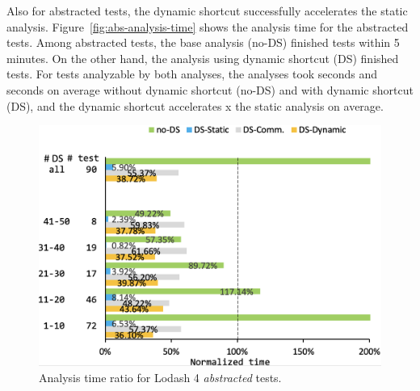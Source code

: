 Also for abstracted tests, the dynamic shortcut successfully accelerates the
static analysis.  Figure~\ref{fig:abs-analysis-time} shows the analysis time for
the abstracted tests.  Among  abstracted tests, the base analysis
(no-DS) finished  tests within 5 minutes.  On the other hand, the
analysis using dynamic shortcut (DS) finished  tests.  For 
tests analyzable by both analyses, the analyses took  seconds and
 seconds on average without dynamic shortcut (no-DS) and with
dynamic shortcut (DS), and the dynamic shortcut accelerates
\textsf{x} the static analysis on average.

\begin{figure}
  \centering
  \includegraphics[width=\linewidth]{img/abs-analysis-ratio}
  \vspace*{-1.5em}
  \caption{Analysis time ratio for  Lodash 4 \textit{abstracted}
  tests.}
  \label{fig:abs-analysis-ratio}
  \vspace*{-1.5em}
\end{figure}

